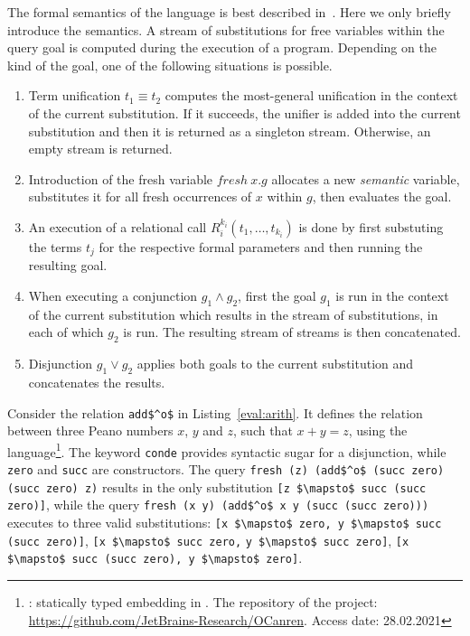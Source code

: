 The formal semantics of the language is best described in~\cite{rozplokhas2020certified}.
Here we only briefly introduce the semantics.
A stream of substitutions for free variables within the query goal is computed during the execution of a \mk program.
Depending on the kind of the goal, one of the following situations is possible.

\begin{enumerate}
  \item Term unification $t_1 \equiv t_2$ computes the most-general unification in the context of the current substitution. If it succeeds, the unifier is added into the current substitution and then it is returned as a singleton stream. Otherwise, an empty stream is returned.
  \item Introduction of the fresh variable $fresh \ x. g$ allocates a new \emph{semantic} variable, substitutes it for all fresh occurrences of $x$ within $g$, then evaluates the goal.
  \item An execution of a relational call $R^{k_i}_i(t_1, \dots, t_{k_i})$ is done by first substuting the terms $t_j$ for the respective formal parameters and then running the resulting goal.
  \item When executing a conjunction $g_1 \wedge g_2$, first the goal $g_1$ is run in the context of the current substitution which results in the stream of substitutions, in each of which $g_2$ is run. The resulting stream of streams is then concatenated.
  \item Disjunction $g_1 \vee g_2$ applies both goals to the current substitution and concatenates the results.
\end{enumerate}

Consider the relation \lstinline{add$^o$} in Listing~\ref{eval:arith}.
It defines the relation between three Peano numbers $x$, $y$ and $z$, such that $x + y = z$, using the \oc language\footnote{\oc: statically typed \mk embedding in \ocaml. The repository of the project: \url{https://github.com/JetBrains-Research/OCanren}. Access date: 28.02.2021}.
The keyword \lstinline{conde} provides syntactic sugar for a disjunction, while \lstinline{zero} and \lstinline{succ} are constructors.
The query \lstinline{fresh (z) (add$^o$ (succ zero) (succ zero) z)} results in the only substitution \lstinline{[z $\mapsto$ succ (succ zero)]}, while the query \lstinline{fresh (x y) (add$^o$ x y (succ (succ zero)))} executes to three valid substitutions: \lstinline{[x $\mapsto$ zero, y $\mapsto$ succ (succ zero)]}, \lstinline{[x $\mapsto$ succ zero,} \lstinline{y $\mapsto$ succ zero]}, \lstinline{[x $\mapsto$ succ (succ zero), y $\mapsto$ zero]}.

